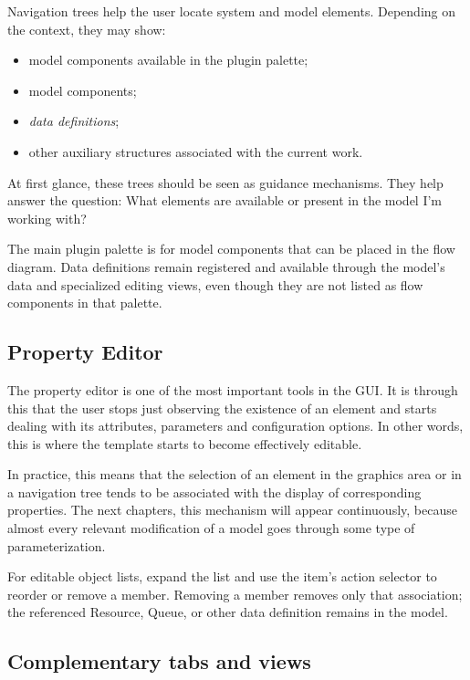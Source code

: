 Navigation trees help the user locate system and model elements. Depending on the context, they may show:
\begin{itemize}
\item model components available in the plugin palette;
\item model components;
\item \textit{data definitions};
\item other auxiliary structures associated with the current work.
\end{itemize}

At first glance, these trees should be seen as guidance mechanisms. They help answer the question: What elements are available or present in the model I'm working with?

The main plugin palette is for model components that can be placed in the flow diagram. Data definitions
remain registered and available through the model's data and specialized editing views, even though they
are not listed as flow components in that palette.

\subsection{Property Editor}
\label{subsec:cap3_editor_propriedades}

The property editor is one of the most important tools in the GUI. It is through this that the user stops just observing the existence of an element and starts dealing with its attributes, parameters and configuration options. In other words, this is where the template starts to become effectively editable.

In practice, this means that the selection of an element in the graphics area or in a navigation tree tends to be associated with the display of corresponding properties. The next chapters, this mechanism will appear continuously, because almost every relevant modification of a model goes through some type of parameterization.

For editable object lists, expand the list and use the item's action selector
to reorder or remove a member. Removing a member removes only that association;
the referenced Resource, Queue, or other data definition remains in the model.

\subsection{Complementary tabs and views}
\label{subsec:cap3_abas_visoes_complementares}

